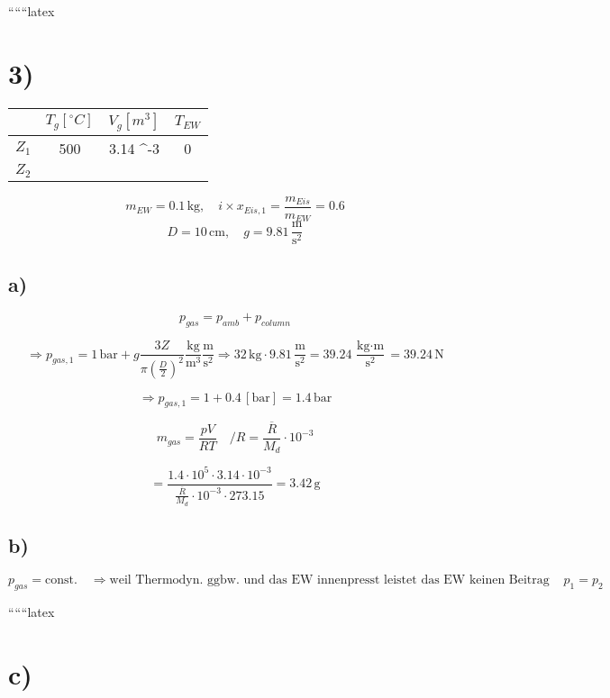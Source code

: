 
``````latex


\section*{3)}

\begin{tabular}{|c|c|c|c|}
\hline
 & $T_g [^\circ C]$ & $V_g [m^3]$ & $T_{EW}$ \\
\hline
$Z_1$ & 500 & 3.14 \cdot 10^{-3} & 0 \\
\hline
$Z_2$ &  &  &  \\
\hline
\end{tabular}

\[
m_{EW} = 0.1 \, \text{kg}, \quad i \times x_{Eis,1} = \frac{m_{Eis}}{m_{EW}} = 0.6
\]
\[
D = 10 \, \text{cm}, \quad g = 9.81 \, \frac{\text{m}}{\text{s}^2}
\]

\subsection*{a)}

\[
p_{gas} = p_{amb} + p_{column}
\]

\[
\Rightarrow p_{gas,1} = 1 \, \text{bar} + g \frac{3Z}{\pi \left( \frac{D}{2} \right)^2} \frac{\text{kg}}{\text{m}^3} \frac{\text{m}}{\text{s}^2} \Rightarrow 32 \, \text{kg} \cdot 9.81 \, \frac{\text{m}}{\text{s}^2} = 39.24 \, \frac{\text{kg} \cdot \text{m}}{\text{s}^2} = 39.24 \, \text{N}
\]

\[
\Rightarrow p_{gas,1} = 1 + 0.4 \, [\text{bar}] = 1.4 \, \text{bar}
\]

\[
m_{gas} = \frac{pV}{RT} \quad /R = \frac{\overline{R}}{M_d} \cdot 10^{-3}
\]

\[
= \frac{1.4 \cdot 10^5 \cdot 3.14 \cdot 10^{-3}}{\frac{\overline{R}}{M_d} \cdot 10^{-3} \cdot 273.15} = 3.42 \, \text{g}
\]

\subsection*{b)}

\[
p_{gas} = \text{const.} \quad \Rightarrow \text{weil Thermodyn. ggbw. und das EW innenpresst leistet das EW keinen Beitrag zum Druck, also muss } p_1 = p_2
\]

``````latex


\section*{c)}


